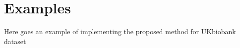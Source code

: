 

\section{Examples}\label{sec:examples}

Here goes an example of implementing the proposed method for UKbiobank dataset